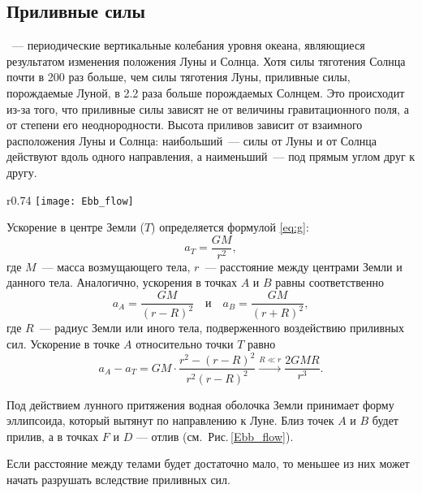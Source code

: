 \subsection{Приливные силы}

~--- периодические вертикальные колебания уровня океана, являющиеся результатом изменения положения Луны и Солнца. Хотя силы тяготения Солнца почти в 200 раз больше, чем силы тяготения Луны, приливные силы, порождаемые Луной, в 2.2 раза больше порождаемых Солнцем. Это происходит из-за того, что приливные силы зависят не от величины гравитационного поля, а от степени его неоднородности. Высота приливов зависит от взаимного расположения Луны и Солнца: наибольший~---  силы от Луны и от Солнца действуют вдоль одного направления, а наименьший~--- под прямым углом друг к другу.

\begin{wrapfigure}[11]{r}{0.74\tw}
	\vspace{-.5pc}
	\texttt{[image: Ebb\_flow]}
	\caption{К объяснению приливных сил}\label{Ebb_flow}
\end{wrapfigure}
Ускорение в центре Земли ($T$) определяется формулой \eqref{eq:g}:
\begin{equation*}
    a_T=\frac{G M}{r^2},
\end{equation*}
где $M$~--- масса возмущающего тела, $r$~--- расстояние между центрами Земли и данного тела. Аналогично, ускорения в точках $A$ и $B$ равны соответственно
\begin{equation}
	a_A = \frac{G M}{(r - R)^2} \quad \text{и} \quad a_B = \frac{GM}{(r + R)^2},
\end{equation}
где $R$~--- радиус Земли или иного тела, подверженного воздействию приливных сил. Ускорение в точке $A$ относительно точки $T$ равно
\begin{equation}
    a_A - a_T = GM \cdot \frac{r^2 - (r - R)^2}{r^2 (r - R)^2} \xrightarrow{R \ll r} \frac{2 G M R}{r^3}.
	\label{eq:ebb-force}
\end{equation}

Под действием лунного притяжения водная оболочка Земли принимает форму
эллипсоида, который вытянут по направлению к Луне. Близ точек $A$ и $B$ будет
прилив, а в точках $F$ и $D$ --- отлив (см.~Рис.\,\ref{Ebb_flow}).

Если расстояние между телами будет достаточно мало, то меньшее из них может начать разрушать вследствие приливных сил.


